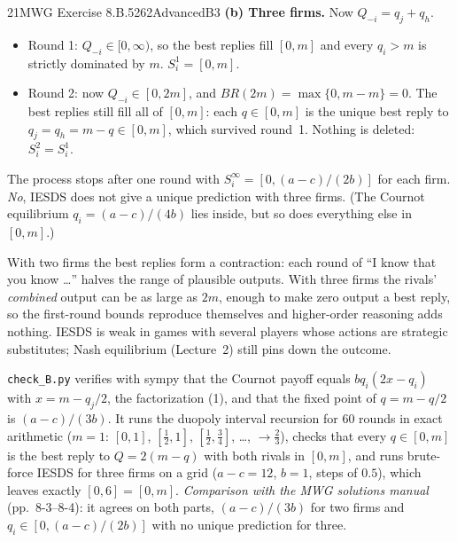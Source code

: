 \begin{exsol}{21}{MWG Exercise 8.B.5}{262}{Advanced}{B3}
\textbf{(b) Three firms.} Now $Q_{-i} = q_j + q_h$.
\begin{itemize}
  \item Round 1: $Q_{-i} \in [0, \infty)$, so the best replies fill $[0, m]$ and every $q_i > m$
  is strictly dominated by $m$. $S_i^1 = [0, m]$.
  \item Round 2: now $Q_{-i} \in [0, 2m]$, and $BR(2m) = \max\{0, m - m\} = 0$. The best replies
  still fill all of $[0, m]$: each $q \in [0, m]$ is the unique best reply to
  $q_j = q_h = m - q \in [0, m]$, which survived round~1. Nothing is deleted:
  $S_i^2 = S_i^1$.
\end{itemize}
The process stops after one round with $S_i^\infty = [0, (a-c)/(2b)]$ for each firm. \emph{No},
IESDS does not give a unique prediction with three firms. (The Cournot equilibrium
$q_i = (a-c)/(4b)$ lies inside, but so does everything else in $[0, m]$.)

\interp With two firms the best replies form a contraction: each round of ``I know that you
know \dots'' halves the range of plausible outputs. With three firms the rivals' \emph{combined}
output can be as large as $2m$, enough to make zero output a best reply, so the first-round
bounds reproduce themselves and higher-order reasoning adds nothing. IESDS is weak in games with
several players whose actions are strategic substitutes; Nash equilibrium (Lecture~2) still
pins down the outcome.

\verify \texttt{check\_B.py} verifies with sympy that the Cournot payoff equals $b q_i(2x - q_i)$
with $x = m - q_j/2$, the factorization (1), and that the fixed point of $q = m - q/2$ is
$(a-c)/(3b)$. It runs the duopoly interval recursion for 60 rounds in exact arithmetic ($m = 1$:
$[0,1]$, $[\tfrac12, 1]$, $[\tfrac12, \tfrac34]$, \dots, $\to \tfrac23$), checks that every
$q \in [0, m]$ is the best reply to $Q = 2(m - q)$ with both rivals in $[0, m]$, and runs
brute-force IESDS for three firms on a grid ($a - c = 12$, $b = 1$, steps of $0.5$), which leaves
exactly $[0, 6] = [0, m]$. \emph{Comparison with the MWG solutions manual} (pp.~8-3--8-4): it
agrees on both parts, $(a-c)/(3b)$ for two firms and $q_i \in [0, (a-c)/(2b)]$ with no unique
prediction for three.

\end{exsol}
